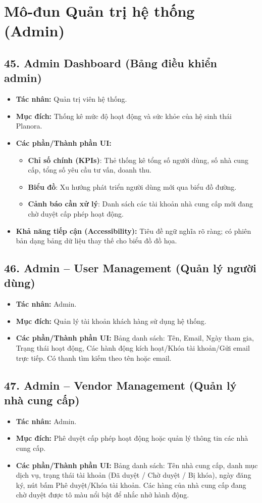 \documentclass[11pt,a4paper]{article}
\begin{document}
\section{Mô-đun Quản trị hệ thống (Admin)}

\subsection{45. Admin Dashboard (Bảng điều khiển admin)}
\begin{itemize}
    \item \textbf{Tác nhân:} Quản trị viên hệ thống.
    \item \textbf{Mục đích:} Thống kê mức độ hoạt động và sức khỏe của hệ sinh thái Planora.
    \item \textbf{Các phần/Thành phần UI:}
    \begin{itemize}
        \item \textbf{Chỉ số chính (KPIs)}: Thẻ thống kê tổng số người dùng, số nhà cung cấp, tổng số yêu cầu tư vấn, doanh thu.
        \item \textbf{Biểu đồ}: Xu hướng phát triển người dùng mới qua biểu đồ đường.
        \item \textbf{Cảnh báo cần xử lý}: Danh sách các tài khoản nhà cung cấp mới đang chờ duyệt cấp phép hoạt động.
    \end{itemize}
    \item \textbf{Khả năng tiếp cận (Accessibility):} Tiêu đề ngữ nghĩa rõ ràng; có phiên bản dạng bảng dữ liệu thay thế cho biểu đồ đồ họa.
\end{itemize}

\subsection{46. Admin – User Management (Quản lý người dùng)}
\begin{itemize}
    \item \textbf{Tác nhân:} Admin.
    \item \textbf{Mục đích:} Quản lý tài khoản khách hàng sử dụng hệ thống.
    \item \textbf{Các phần/Thành phần UI:} Bảng danh sách: Tên, Email, Ngày tham gia, Trạng thái hoạt động, Các hành động kích hoạt/Khóa tài khoản/Gửi email trực tiếp. Có thanh tìm kiếm theo tên hoặc email.
\end{itemize}

\subsection{47. Admin – Vendor Management (Quản lý nhà cung cấp)}
\begin{itemize}
    \item \textbf{Tác nhân:} Admin.
    \item \textbf{Mục đích:} Phê duyệt cấp phép hoạt động hoặc quản lý thông tin các nhà cung cấp.
    \item \textbf{Các phần/Thành phần UI:} Bảng danh sách: Tên nhà cung cấp, danh mục dịch vụ, trạng thái tài khoản (Đã duyệt / Chờ duyệt / Bị khóa), ngày đăng ký, nút bấm Phê duyệt/Khóa tài khoản. Các hàng của nhà cung cấp đang chờ duyệt được tô màu nổi bật để nhắc nhở hành động.
\end{itemize}
\end{document}
